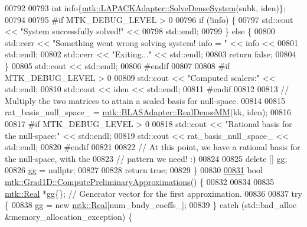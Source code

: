 \begin{DoxyCode}
{{00792 
00793   \textcolor{keywordtype}{int} info\{\hyperlink{classmtk_1_1LAPACKAdapter_a7428bccf74fd4a4af68fb7233846da22}{mtk::LAPACKAdapter::SolveDenseSystem}(subk, iden)\};
00794 
00795 \textcolor{preprocessor}{  #if MTK\_DEBUG\_LEVEL > 0}
00796   \textcolor{keywordflow}{if} (!info) \{
00797     std::cout << \textcolor{stringliteral}{"System successfully solved!"} <<
00798       std::endl;
00799   \} \textcolor{keywordflow}{else} \{
00800     std::cerr << \textcolor{stringliteral}{"Something went wrong solving system! info = "} << info <<
00801       std::endl;
00802     std::cerr << \textcolor{stringliteral}{"Exiting..."} << std::endl;
00803     \textcolor{keywordflow}{return} \textcolor{keyword}{false};
00804   \}
00805   std::cout << std::endl;
00806 \textcolor{preprocessor}{  #endif}
00807 
00808 \textcolor{preprocessor}{  #if MTK\_DEBUG\_LEVEL > 0}
00809   std::cout << \textcolor{stringliteral}{"Computed scalers:"} << std::endl;
00810   std::cout << iden << std::endl;
00811 \textcolor{preprocessor}{  #endif}
00812 
00813   \textcolor{comment}{// Multiply the two matrices to attain a scaled basis for null-space.}
00814 
00815   rat\_basis\_null\_space\_ = \hyperlink{classmtk_1_1BLASAdapter_acebd0e9bfe0bdd609c7fbea98ccfd3b5}{mtk::BLASAdapter::RealDenseMM}(kk, iden);
00816 
00817 \textcolor{preprocessor}{  #if MTK\_DEBUG\_LEVEL > 0}
00818   std::cout << \textcolor{stringliteral}{"Rational basis for the null-space:"} << std::endl;
00819   std::cout << rat\_basis\_null\_space\_ << std::endl;
00820 \textcolor{preprocessor}{  #endif}
00821 
00822   \textcolor{comment}{// At this point, we have a rational basis for the null-space, with the}
00823   \textcolor{comment}{// pattern we need! :)}
00824 
00825   \textcolor{keyword}{delete} [] gg;
00826   gg = \textcolor{keyword}{nullptr};
00827 
00828   \textcolor{keywordflow}{return} \textcolor{keyword}{true};
00829 \}
00830 
\hypertarget{mtk__grad__1d_8cc_source_l00831}{}\hyperlink{classmtk_1_1Grad1D_add4c68a6e78d8b9c2b800b3f96f4757d}{00831} \textcolor{keywordtype}{bool} \hyperlink{classmtk_1_1Grad1D_add4c68a6e78d8b9c2b800b3f96f4757d}{mtk::Grad1D::ComputePreliminaryApproximations}() \{
00832 
00834 
00835   \hyperlink{group__c01-roots_gac080bbbf5cbb5502c9f00405f894857d}{mtk::Real} *gg\{\}; \textcolor{comment}{// Generator vector for the first approximation.}
00836 
00837   \textcolor{keywordflow}{try} \{
00838     gg = \textcolor{keyword}{new} \hyperlink{group__c01-roots_gac080bbbf5cbb5502c9f00405f894857d}{mtk::Real}[num\_bndy\_coeffs\_];
00839   \} \textcolor{keywordflow}{catch} (std::bad\_alloc &memory\_allocation\_exception) \{
}}
\end{DoxyCode}
